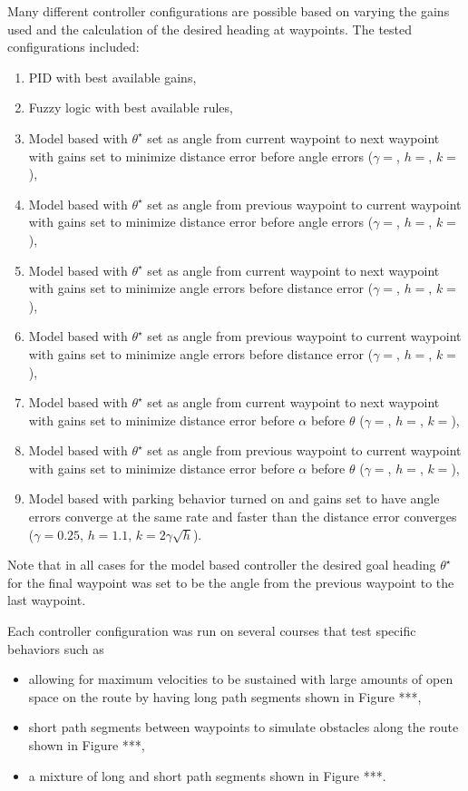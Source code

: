 Many different controller configurations are possible based on varying the gains used and the calculation of the desired heading at waypoints. The tested configurations included:
\begin{enumerate}
\item PID with best available gains,
\item Fuzzy logic with best available rules,
\item Model based with $\theta^\star$ set as angle from current waypoint to next waypoint with gains set to minimize distance error before angle errors ($\gamma = $, $h = $, $k = $),
\item Model based with $\theta^\star$ set as angle from previous waypoint to current waypoint with gains set to minimize distance error before angle errors ($\gamma = $, $h = $, $k = $),
\item Model based with $\theta^\star$ set as angle from current waypoint to next waypoint with gains set to minimize angle errors before distance error ($\gamma = $, $h = $, $k = $),
\item Model based with $\theta^\star$ set as angle from previous waypoint to current waypoint with gains set to minimize angle errors before distance error ($\gamma = $, $h = $, $k = $),
\item Model based with $\theta^\star$ set as angle from current waypoint to next waypoint with gains set to minimize distance error before $\alpha$ before $\theta$ ($\gamma = $, $h = $, $k = $),
\item Model based with $\theta^\star$ set as angle from previous waypoint to current waypoint with gains set to minimize distance error before $\alpha$ before $\theta$ ($\gamma = $, $h = $, $k = $),
\item Model based with parking behavior turned on and gains set to have angle errors converge at the same rate and faster than the distance error converges ($\gamma = 0.25$, $h = 1.1$, $k = 2\gamma\sqrt{h}$).
\end{enumerate}
Note that in all cases for the model based controller the desired goal heading $\theta^\star$ for the final waypoint was set to be the angle from the previous waypoint to the last waypoint.

Each controller configuration was run on several courses that test specific behaviors such as
\begin{itemize}
\item allowing for maximum velocities to be sustained with large amounts of open space on the route by having long path segments shown in Figure ***,
\item short path segments between waypoints to simulate obstacles along the route shown in Figure ***,
\item a mixture of long and short path segments shown in Figure ***.
\end{itemize}


